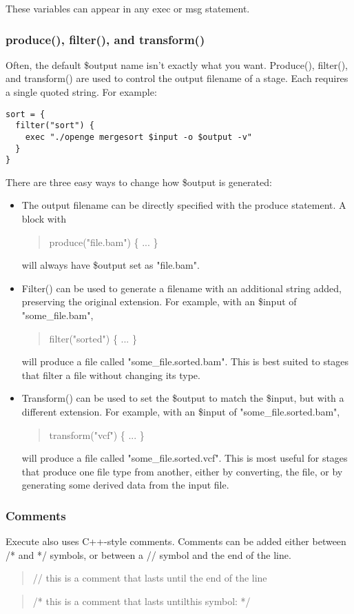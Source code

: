 \documentclass[11pt]{article}
\newcommand {\cmd}[1] {\begin{quote}#1\end{quote}}
\begin{document}
These variables can appear in any exec or msg statement.

\subsubsection{produce(), filter(), and transform()}
Often, the default \$output name isn't exactly what you want. Produce(), filter(), and transform() are used to control the output filename of a stage. Each requires a single quoted string. For example:

\begin{verbatim}
sort = {
  filter("sort") {
    exec "./openge mergesort $input -o $output -v"
  }
}
\end{verbatim}

There are three easy ways to change how \$output is generated:
\begin{itemize}
\item The output filename can be directly specified with the produce statement. A block with
\cmd{produce("file.bam") \{ ... \} }
will always have \$output set as "file.bam".
\item Filter() can be used to generate a filename with an additional string added, preserving the original extension. For example, with an \$input of "some\_file.bam",
\cmd{filter("sorted") \{ ... \} }
will produce a file called "some\_file.sorted.bam". This is best suited to stages that filter a file without changing its type.
\item Transform() can be used to set the \$output to match the \$input, but with a different extension. For example, with an \$input of "some\_file.sorted.bam",
\cmd{transform("vcf") \{ ... \} }
will produce a file called "some\_file.sorted.vcf". This is most useful for stages that produce one file type from another, either by converting, the file, or by generating some derived data from the input file.
\end{itemize}
\subsubsection{Comments}
Execute also uses C++-style comments. Comments can be added either between /* and */ symbols, or between a // symbol and the end of the line.
\cmd{// this is a comment that lasts until the end of the line}
\cmd{/* this is a comment that lasts until\newline this symbol: */}
\end{document}
